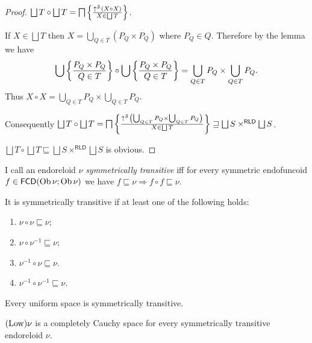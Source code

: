\begin{proof}
  $\bigsqcup T \circ \bigsqcup T = \bigsqcap \setcond{ \uparrow^{\mathfrak{F}}
  (X \circ X) }{ X \in \bigsqcup T }$.
  
  If $X \in \bigsqcup T$ then $X = \bigcup_{Q \in T} (P_Q \times P_Q)$ where
  $P_Q \in Q$. Therefore by the lemma we have
  \[ \bigcup \left\{ \frac{ P_Q \times P_Q}{Q \in T}\right\} \circ \bigcup
  \left\{ \frac{ P_Q \times P_Q}{ Q \in T }\right\} = \bigcup_{Q \in T} P_Q \times \bigcup_{Q \in T} P_Q .
  \]
  Thus $X \circ X = \bigcup_{Q \in T} P_Q \times \bigcup_{Q \in T} P_Q$.
  
  Consequently $\bigsqcup T \circ \bigsqcup T = \bigsqcap \setcond{
  \uparrow^{\mathfrak{F}} \left( \bigcup_{Q \in T} P_Q \times \bigcup_{Q \in
  T} P_Q \right)}{X \in \bigsqcup T }
  \sqsupseteq \bigsqcup S \times^{\mathsf{RLD}} \bigsqcup S$.
  
  $\bigsqcup T \circ \bigsqcup T \sqsubseteq \bigsqcup S
  \times^{\mathsf{RLD}} \bigsqcup S$ is obvious.
\end{proof}

\begin{defn}
  I call an endoreloid $\nu$ \emph{symmetrically transitive} iff for every
  symmetric endofuncoid $f \in \mathsf{FCD} (\operatorname{Ob} \nu ; \operatorname{Ob}
  \nu)$ we have $f \sqsubseteq \nu \Rightarrow f \circ f \sqsubseteq \nu$.
\end{defn}

\begin{obvious}
  It is symmetrically transitive if at least one of the following holds:
  \begin{enumerate}
    \item $\nu \circ \nu \sqsubseteq \nu$;
    
    \item $\nu \circ \nu^{- 1} \sqsubseteq \nu$;
    
    \item $\nu^{- 1} \circ \nu \sqsubseteq \nu$.
    
    \item $\nu^{- 1} \circ \nu^{- 1} \sqsubseteq \nu$.
  \end{enumerate}
\end{obvious}

\begin{cor}
  Every uniform space is symmetrically transitive.
\end{cor}

\begin{prop}
  $(\operatorname{Low}) \nu$ is a completely Cauchy space for every symmetrically
  transitive endoreloid $\nu$.
\end{prop}

